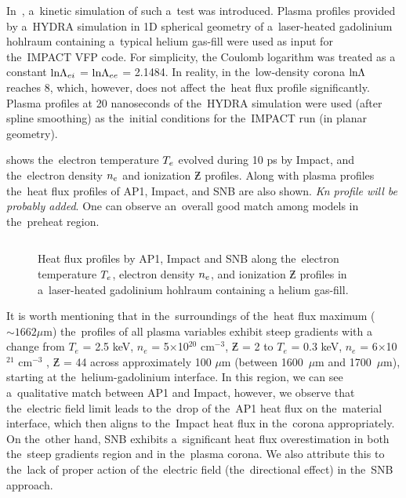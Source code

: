 In~\cite{Brodrick_PoP2017}, a~kinetic simulation of such a~test was introduced.
Plasma profiles provided by a~HYDRA simulation in 1D spherical
geometry of a~laser-heated gadolinium hohlraum containing a~typical helium 
gas-fill were used as input for the~IMPACT \cite{Kingham_JCP2004} VFP code.  
For simplicity, the Coulomb logarithm was treated as a
constant $\text{ln}\Lambda_{ei}$ = $\text{ln}\Lambda_{ee}$ = 2.1484. In reality, in the~low-density 
corona $\text{ln}\Lambda$ reaches 8, which, however, does not affect the~heat flux profile 
significantly. Plasma profiles at 20 nanoseconds of the~HYDRA simulation 
were used (after spline smoothing) as the~initial conditions for 
the~IMPACT run (in planar geometry).

 shows the~electron temperature $T_e$ 
evolved during 10 ps by Impact, and the~electron density $n_e$ and 
ionization $\Zbar$ profiles. Along with plasma profiles the~heat flux profiles
of AP1, Impact, and SNB are also shown. 
\textit{Kn profile will be probably added}. One can observe an~overall good
match among models in the~preheat region.

\begin{figure}[tbh]
  \begin{center}
    \begin{tabular}{c}
    \end{tabular}
  \caption{
  Heat flux profiles by AP1, Impact and SNB along 
  the~electron temperature $T_e$, electron density $n_e$, 
  and ionization $\Zbar$ profiles in a~laser-heated gadolinium hohlraum 
  containing a helium gas-fill.
  }
  \label{fig:Gd_VFP_10ps_heatflux}
  \end{center} 
\end{figure}

It is worth mentioning that in the~surroundings of the~heat flux maximum 
($\sim 1662 \mu$m) the~profiles of all plasma variables exhibit steep gradients 
with a change from $T_e$ = 2.5 keV, $n_e$ = 5$\times$10$^{20}$ cm$^{−3}$, 
$\Zbar$ = 2 to $T_e$ = 0.3 keV, $n_e$ = 6$\times$10$^{21}$ cm$^{−3}$ , 
$\Zbar$ = 44 across approximately 100 $\mu$m 
(between 1600~$\mu$m and 1700~$\mu$m), starting at the~helium-gadolinium 
interface.  
In this region, we can see a~qualitative match between AP1 and Impact, however,
we observe that the~electric field limit  leads to 
the~drop of the~AP1 heat flux on the~material interface, which then aligns to 
the~Impact heat flux in the~corona appropriately. On the~other hand, 
SNB exhibits a~significant heat flux overestimation in both
the~steep gradients region and in the~plasma corona. We also attribute this
to the~lack of proper action of the~electric field (the~directional effect) 
in the~SNB approach.

%
